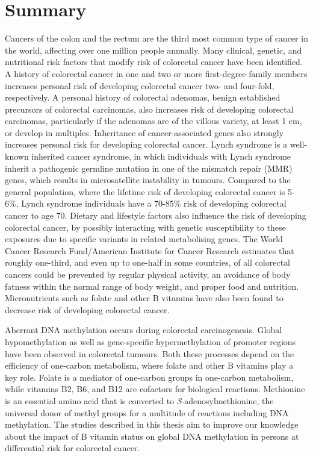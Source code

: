 \chapter*{Summary}
\label{summary}


\newpage

\noindent Cancers of the colon and the rectum are the third most common type of cancer in the world, affecting over one million people annually. Many clinical, genetic, and nutritional risk factors that modify risk of colorectal cancer have been identified. A history of colorectal cancer in one and two or more first-degree family members increases personal risk of developing colorectal cancer two- and four-fold, respectively. A personal history of colorectal adenomas, benign established precursors of colorectal carcinomas, also increases risk of developing colorectal carcinomas, particularly if the adenomas are of the villous variety, at least 1 cm, or develop in multiples. Inheritance of cancer-associated genes also strongly increases personal risk for developing colorectal cancer. Lynch syndrome is a well-known inherited cancer syndrome, in which individuals with Lynch syndrome inherit a pathogenic germline mutation in one of the mismatch repair (MMR) genes, which results in microsatellite instability in tumours. Compared to the general population, where the lifetime risk of developing colorectal cancer is 5-6\%, Lynch syndrome individuals have a 70-85\% risk of developing colorectal cancer to age 70. Dietary and lifestyle factors also influence the risk of developing colorectal cancer, by possibly interacting with genetic susceptibility to these exposures due to specific variants in related metabolising genes. The World Cancer Research Fund/American Institute for Cancer Research estimates that roughly one-third, and even up to one-half in some countries, of all colorectal cancers could be prevented by regular physical activity, an avoidance of body fatness within the normal range of body weight, and proper food and nutrition. Micronutrients such as folate and other B vitamins have also been found to decrease risk of developing colorectal cancer.

\noindent Aberrant DNA methylation occurs during colorectal carcinogenesis. Global hypomethylation as well as gene-specific hypermethylation of promoter regions have been observed in colorectal tumours. Both these processes depend on the efficiency of one-carbon metabolism, where folate and other B vitamins play a key role. Folate is a mediator of one-carbon groups in one-carbon metabolism, while vitamins B2, B6, and B12 are cofactors for biological reactions. Methionine is an essential amino acid that is converted to \emph{S}-adenosylmethionine, the universal donor of methyl groups for a multitude of reactions including DNA methylation. The studies described in this thesis aim to improve our knowledge about the impact of B vitamin status on global DNA methylation in persons at differential risk for colorectal cancer.

